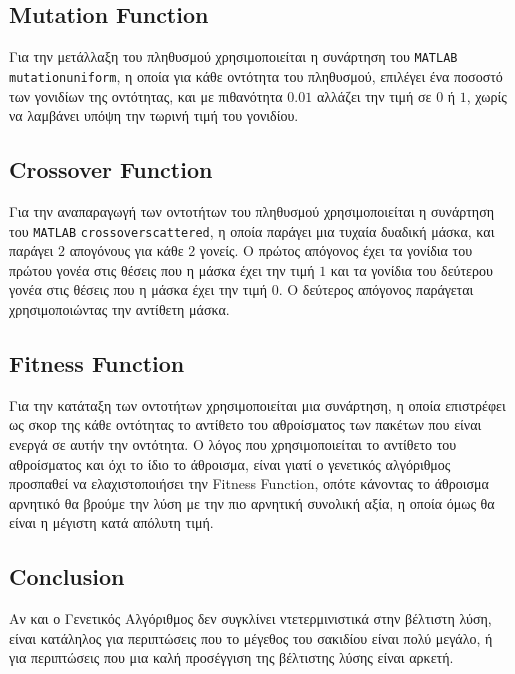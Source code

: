 \documentclass{article}
\begin{document}
\subsection{Mutation Function}

Για την μετάλλαξη του πληθυσμού χρησιμοποιείται η συνάρτηση του \verb|MATLAB|
\verb|mutationuniform|, η οποία για κάθε οντότητα του πληθυσμού, επιλέγει ένα ποσοστό
των γονιδίων της οντότητας, και με πιθανότητα $0.01$ αλλάζει την τιμή σε $0$ ή
$1$, χωρίς να λαμβάνει υπόψη την τωρινή τιμή του γονιδίου.

\subsection{Crossover Function}

Για την αναπαραγωγή των οντοτήτων του πληθυσμού χρησιμοποιείται η συνάρτηση του
\verb|MATLAB| \verb|crossoverscattered|, η οποία παράγει μια τυχαία δυαδική μάσκα, και
παράγει $2$ απογόνους για κάθε $2$ γονείς. Ο πρώτος απόγονος έχει τα γονίδια του
πρώτου γονέα στις θέσεις που η μάσκα έχει την τιμή $1$ και τα γονίδια του
δεύτερου γονέα στις θέσεις που η μάσκα έχει την τιμή $0$. Ο δεύτερος απόγονος
παράγεται χρησιμοποιώντας την αντίθετη μάσκα.

\subsection{Fitness Function}

Για την κατάταξη των οντοτήτων χρησιμοποιείται μια συνάρτηση, η οποία επιστρέφει
ως σκορ της κάθε οντότητας το αντίθετο του αθροίσματος των πακέτων που είναι
ενεργά σε αυτήν την οντότητα. Ο λόγος που χρησιμοποιείται το αντίθετο του
αθροίσματος και όχι το ίδιο το άθροισμα, είναι γιατί ο γενετικός αλγόριθμος
προσπαθεί να ελαχιστοποιήσει την Fitness Function, οπότε κάνοντας το άθροισμα
αρνητικό θα βρούμε την λύση με την πιο αρνητική συνολική αξία, η οποία όμως θα
είναι η μέγιστη κατά απόλυτη τιμή.

\subsection{Conclusion}

Αν και ο Γενετικός Αλγόριθμος δεν συγκλίνει ντετερμινιστικά στην βέλτιστη λύση,
είναι κατάληλος για περιπτώσεις που το μέγεθος του σακιδίου είναι πολύ μεγάλο, ή
για περιπτώσεις που μια καλή προσέγγιση της βέλτιστης λύσης είναι αρκετή.
\end{document}
